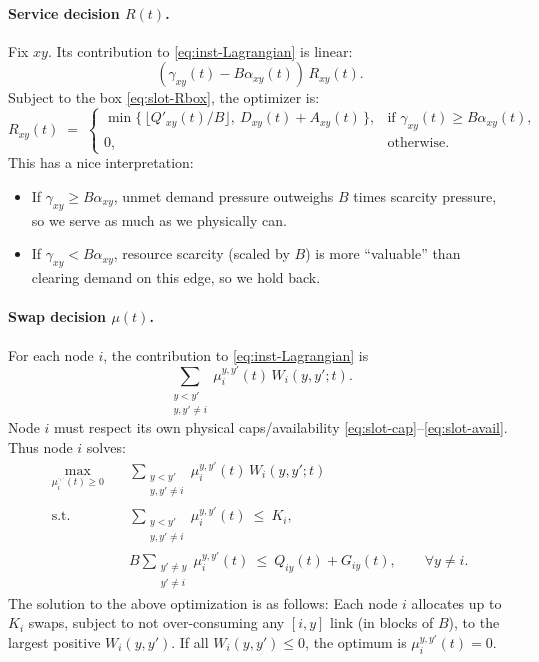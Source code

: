 \documentclass[11pt]{article}
\begin{document}
\paragraph{Service decision $R(t)$.}
Fix $xy$. Its contribution to \eqref{eq:inst-Lagrangian} is linear:
\[
(\gamma_{xy}(t)-B\alpha_{xy}(t))\,R_{xy}(t).
\]
Subject to the box \eqref{eq:slot-Rbox}, the optimizer is:
\begin{equation}
R_{xy}(t)\;=\;
\begin{cases}
\min\!\big\{\,\lfloor Q'_{xy}(t)/B\rfloor,\ D_{xy}(t)+A_{xy}(t)\,\big\},
&\text{if }\gamma_{xy}(t)\ge B\alpha_{xy}(t),\\[4pt]
0, &\text{otherwise.}
\end{cases}
\label{eq:Rrule-detailed}
\end{equation}
This has a nice interpretation:
\begin{itemize}[leftmargin=2em]
\item If $\gamma_{xy} \ge B\alpha_{xy}$, unmet demand pressure outweighs $B$ times scarcity pressure, so we serve as much as we physically can.
\item If $\gamma_{xy} < B\alpha_{xy}$, resource scarcity (scaled by $B$) is more ``valuable'' than clearing demand on this edge, so we hold back.
\end{itemize}

\paragraph{Swap decision $\mu(t)$.}
For each node $i$, the contribution to \eqref{eq:inst-Lagrangian} is
\[
\sum_{\substack{y<y'\\ y,y'\neq i}}
\mu_i^{y,y'}(t)\,W_i(y,y';t).
\]
Node $i$ must respect its own physical caps/availability \eqref{eq:slot-cap}--\eqref{eq:slot-avail}. Thus node $i$ solves:
\begin{equation}
\begin{aligned}
\max_{\mu_i^{\cdot,\cdot}(t)\ge 0}\quad
&\sum_{\substack{y<y'\\ y,y'\neq i}}
\mu_i^{y,y'}(t)\,W_i(y,y';t) \\[2pt]
\text{s.t.}\quad
&\sum_{\substack{y<y'\\ y,y'\neq i}}
\mu_i^{y,y'}(t)\ \le\ K_i, \\
&B\sum_{\substack{y'\neq y\\ y'\neq i}}
\mu_i^{y,y'}(t)
\ \le\ Q_{iy}(t)+G_{iy}(t),
\qquad \forall y\neq i.
\end{aligned}
\label{eq:nodeILP-detailed}
\end{equation}
The solution to the above optimization is as follows: Each node $i$ allocates up to $K_i$ swaps, subject to not over-consuming any $[i,y]$ link (in blocks of $B$), to the
largest positive $W_i(y,y')$. If all $W_i(y,y')\le 0$, the optimum is $\mu_i^{y,y'}(t)=0$.
\end{document}
